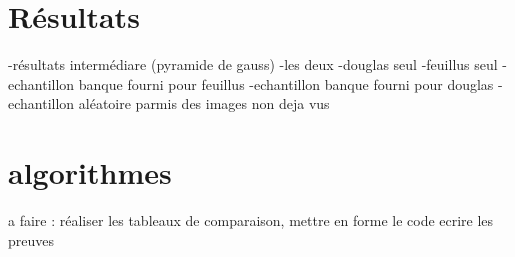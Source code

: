 \documentclass{article}
\begin{document}
	\section{Résultats}	
		-résultats intermédiare (pyramide de gauss)
		-les deux 
		-douglas seul 
		-feuillus seul
		-echantillon banque fourni pour feuillus
		-echantillon banque fourni pour douglas 
		-echantillon aléatoire parmis des images non deja vus
	
	\section{algorithmes}


a faire : réaliser les tableaux de comparaison, mettre en forme le code 
ecrire les preuves 
\end{document}
